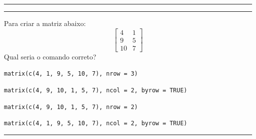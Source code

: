 \documentclass[a4paper,11pt,fleqn]{article}\usepackage[]{graphicx}\usepackage[]{color}
\theoremstyle{definition}
\begin{document}
\vspace{0.3cm}
\hrule
\vspace{0.3cm}

\newpage

\vspace{0.3cm}
\hrule
\vspace{0.3cm}

\begin{compactenum}[18.]
\item Para criar a matriz abaixo:
    \[ \left[ \begin{array}{cc}
        4 & 1 \\
        9 & 5 \\
        10 & 7
      \end{array} \right] \]
Qual seria o comando correto?
    \begin{compactenum}
    \item \texttt{matrix(c(4, 1, 9, 5, 10, 7), nrow = 3)}
    \item \texttt{matrix(c(4, 9, 10, 1, 5, 7), ncol = 2, byrow = TRUE)}
    \item \texttt{matrix(c(4, 9, 10, 1, 5, 7), nrow = 2)}
    \item \texttt{matrix(c(4, 1, 9, 5, 10, 7), ncol = 2, byrow = TRUE)}
    \end{compactenum}
\end{compactenum}

\vspace{0.3cm}
\hrule
\vspace{0.3cm}
\end{document}
